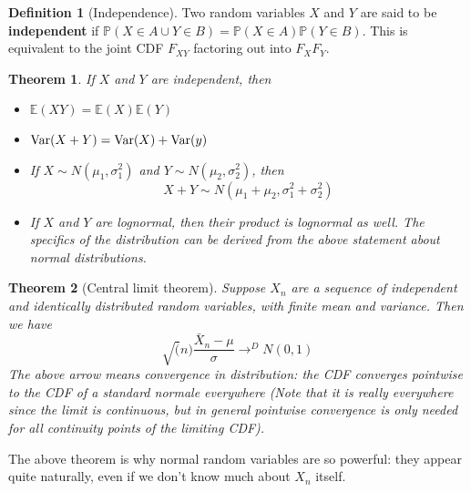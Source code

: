 \documentclass{article}
\numberwithin{equation}{section}
\newtheorem{theorem}{Theorem}[section]
\theoremstyle{definition}
\newtheorem{definition}{Definition}[section]
\newcommand{\pr}{\mathbb{P}}
\newcommand{\E}{\mathbb{E}}
\newcommand{\V}{\textup{Var}}
\begin{document}
\begin{definition}[Independence]
    Two random variables $X$ and $Y$ are said to be \textbf{independent} if $\pr(X \in A \cup Y \in B) = \pr(X \in A)\pr(Y \in B)$.
    This is equivalent to the joint CDF $F_{XY}$ factoring out into $F_X F_Y$.
\end{definition}
\begin{theorem}
    If $X$ and $Y$ are independent, then
    \begin{itemize}
        \item $\E(XY) = \E(X) \E(Y)$
        \item $\V(X+Y) = \V(X) + \V(y)$
        \item If $X \sim N(\mu_1, \sigma_1^2)$ and $Y \sim N(\mu_2, \sigma_2^2)$, then
        \begin{equation}
            X+Y \sim N(\mu_1 + \mu_2, \sigma_1^2 + \sigma_2^2)
        \end{equation}
        \item If $X$ and $Y$ are lognormal, then their product is lognormal as well. The specifics of the distribution can be derived from the above statement about normal distributions.
    \end{itemize}
\end{theorem}
\begin{theorem}[Central limit theorem]
    Suppose $X_n$ are a sequence of independent and identically distributed random variables, with finite mean and variance. Then we have
    \begin{equation}
        \sqrt(n) \frac{\bar{X}_n - \mu}{ \sigma} \to^D N(0,1)
    \end{equation}
    The above arrow means convergence in distribution: the CDF converges pointwise to the CDF of a standard normale everywhere (Note that it is really everywhere since the limit is continuous, but in general pointwise convergence is only needed for all continuity points of the limiting CDF).
\end{theorem}
The above theorem is why normal random variables are so powerful: they appear quite naturally, even if we don't know much about $X_n$ itself.
\end{document}
